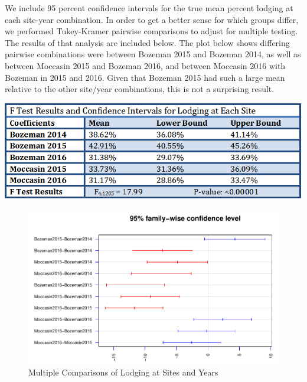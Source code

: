\documentclass[11pt]{article}\usepackage[]{graphicx}\usepackage[]{color}
\makeatletter
\def\maxwidth{ %
  \ifdim\Gin@nat@width>\linewidth
    \linewidth
  \else
    \Gin@nat@width
  \fi
}
\newenvironment{knitrout}{}{} %
\makeatother
\begin{document}
We include 95 percent confidence intervals for the true mean percent lodging at each site-year combination. In order to get a better sense for which groups differ, we performed Tukey-Kramer pairwise comparisons to adjust for multiple testing. The results of that analysis are included below. The plot below shows differing pairwise combinations were between Bozeman 2015 and Bozeman 2014, as well as between Moccasin 2015 and Bozeman 2016, and between Moccasin 2016 with Bozeman in 2015 and 2016. Given that Bozeman 2015 had such a large mean relative to the other site/year combinations, this is not a surprising result. 
  
\includegraphics [width = 4.5 in] {RegressionResults}


\begin{knitrout}\footnotesize
{}\color{fgcolor}\begin{figure}[H]

{\centering \includegraphics[width=\maxwidth]{figure/tukey-1} 

}

\caption[Multiple Comparisons of Lodging at Sites and Years]{Multiple Comparisons of Lodging at Sites and Years}\label{fig:tukey}
\end{figure}


\end{knitrout}
\end{document}
